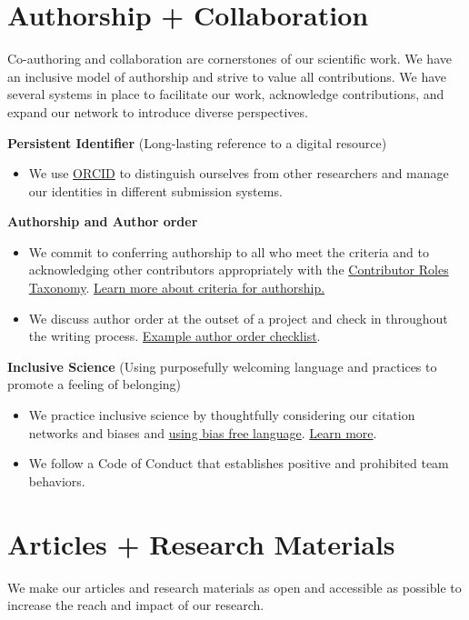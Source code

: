 \documentclass{article}
\begin{document}
\section*{\textcolor{myGreen}{Authorship + Collaboration}}
Co-authoring and collaboration are cornerstones of our scientific work. We have an inclusive model of authorship and strive to value all contributions. We have several systems in place to facilitate our work, acknowledge contributions, and expand our network to introduce diverse perspectives. 

\textbf{Persistent Identifier} (Long-lasting reference to a digital resource)
\begin{itemize}
    \item We use \href{https://orcid.org/}{ORCID} to distinguish ourselves from other researchers and manage our identities in different submission systems.
\end{itemize}
\textbf{Authorship and Author order}
\begin{itemize}
    \item We commit to conferring authorship to all who meet the criteria and to acknowledging other contributors appropriately with the \href{https://credit.niso.org/contributor-roles/}{Contributor Roles Taxonomy}. \href{https://www.icmje.org/recommendations/browse/roles-and-responsibilities/defining-the-role-of-authors-and-contributors.html}{Learn more about criteria for authorship.}
    \item We discuss author order at the outset of a project and check in throughout the writing process. \href{https://docs.google.com/document/d/1-XypwtnwT620-mnHljhOE3ETiPL92GTH0QXtmTgrIBE/edit} {Example author order checklist}.
\end{itemize}
\textbf{Inclusive Science} (Using purposefully welcoming language and practices to promote a feeling of belonging)
\begin{itemize}
    \item We practice inclusive science by thoughtfully considering our citation networks and biases and \href{https://apastyle.apa.org/style-grammar-guidelines/bias-free-language}{using bias free language}. \href{https://complexsystemsupenn.com/diversity-1}{Learn more}. 
    \item We follow a Code of Conduct that establishes positive and prohibited team behaviors. 
\end{itemize}

\section*{\textcolor{myGreen}{Articles + Research Materials}}
We make our articles and research materials as open and accessible as possible to increase the reach and impact of our research. 
\end{document}
